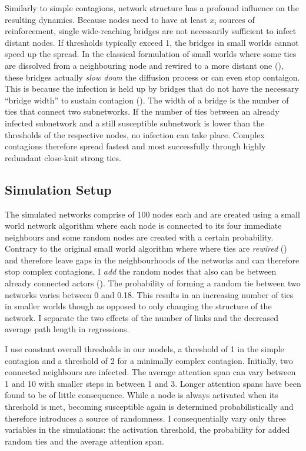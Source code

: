 \documentclass[a4paper,12pt]{article}
\begin{document}
Similarly to simple contagions, network structure has a profound influence on the resulting dynamics. Because nodes need to have at least $x_{i}$ sources of reinforcement, single wide-reaching bridges are not necessarily sufficient to infect distant nodes. If thresholds typically exceed 1, the bridges in small worlds cannot speed up the spread. In the classical formulation of small worlds where some ties are dissolved from a neighbouring node and rewired to a more distant one (\cite{wattsCollectiveDynamicsSmallworld1998}), these bridges actually \textit{slow down} the diffusion process or can even stop contaigon. This is because the infection is held up by bridges that do not have the necessary ``bridge width'' to sustain contagion (\cite[207ff]{centolaHowBehaviorSpreads2018}). The width of a bridge is the number of ties that connect two subnetworks. If the number of ties between an already infected subnetwork and a still susceptible subnetwork is lower than the thresholds of the respective nodes, no infection can take place. Complex contagions therefore spread fastest and most successfully through highly redundant close-knit strong ties.

\subsection{Simulation Setup}

The simulated networks comprise of 100 nodes each and are created using a small world network algorithm where each node is connected to its four immediate neighbours and some random nodes are created with a certain probability. Contrary to the original small world algorithm where where ties are \textit{rewired} (\cite{wattsCollectiveDynamicsSmallworld1998}) and therefore leave gaps in the neighbourhoods of the networks and can therefore stop complex contagions, I \textit{add} the random nodes that also can be between already connected actors (\cite{newmanScalingPercolationSmallworld1999}). The probability of forming a random tie between two networks varies between 0 and 0.18. This results in an increasing number of ties in smaller worlds though as opposed to only changing the structure of the network. I separate the two effects of the number of links and the decreased average path length in regressions. 

I use constant overall thresholds in our models, a threshold of 1 in the simple contagion and a threshold of 2 for a minimally complex contagion. Initially, two connected neighbours are infected. The average attention span can vary between 1 and 10 with smaller steps in between 1 and 3. Longer attention spans have been found to be of little consequence. While a node is always activated when its threshold is met, becoming susceptible again is determined probabilistically and therefore introduces a source of randomness. I consequentially vary only three variables in the simulations: the activation threshold, the probability for added random ties and the average attention span.
\end{document}
